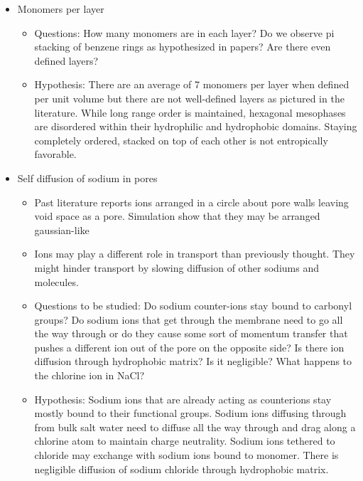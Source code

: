 \documentclass{article}
\begin{document}
\begin{itemize}
	\item Monomers per layer
	\begin{itemize}
		\item Questions: How many monomers are in each layer? 
Do we observe pi stacking of benzene rings as hypothesized in papers? Are there even defined layers?
		\item Hypothesis: There are an average of 7 monomers per layer when defined per unit volume but there are not well-defined layers as pictured in the literature. While long range order is maintained, hexagonal mesophases are disordered within their hydrophilic and hydrophobic domains. Staying completely ordered, stacked on top of each other is not entropically favorable.
	\end{itemize}
	\item Self diffusion of sodium in pores
	\begin{itemize}
		\item Past literature reports ions arranged in a circle about pore walls leaving void space as a pore. Simulation show that they may be arranged gaussian-like	
		\item Ions may play a different role in transport than previously thought. They might hinder transport by slowing diffusion of other sodiums and molecules. 
		\item Questions to be studied: Do sodium counter-ions stay bound to carbonyl groups? Do sodium ions that get through the membrane need to go all the way through or do they cause some sort of momentum transfer that pushes a different ion out of the pore on the opposite side? Is there ion diffusion through hydrophobic matrix? Is it negligible? What happens to the chlorine ion in NaCl?
		\item Hypothesis: Sodium ions that are already acting as counterions stay mostly bound to their functional groups. Sodium ions diffusing through from bulk salt water need to diffuse all the way through and drag along a chlorine atom to maintain charge neutrality. Sodium ions tethered to chloride may exchange with sodium ions bound to monomer. There is negligible diffusion of sodium chloride through hydrophobic matrix.

\end{itemize}
\end{itemize}
\end{document}

